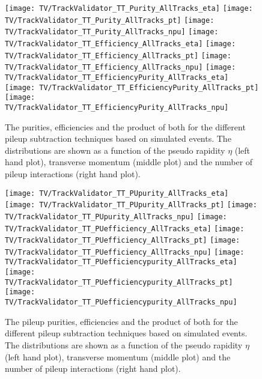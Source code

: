 \begin{figure}[h!t]
  \centering
  \texttt{[image: TV/TrackValidator\_TT\_Purity\_AllTracks\_eta]}
  \texttt{[image: TV/TrackValidator\_TT\_Purity\_AllTracks\_pt]}
  \texttt{[image: TV/TrackValidator\_TT\_Purity\_AllTracks\_npu]}
  \newline
  \texttt{[image: TV/TrackValidator\_TT\_Efficiency\_AllTracks\_eta]}
  \texttt{[image: TV/TrackValidator\_TT\_Efficiency\_AllTracks\_pt]}
  \texttt{[image: TV/TrackValidator\_TT\_Efficiency\_AllTracks\_npu]}
  \newline
  \texttt{[image: TV/TrackValidator\_TT\_EfficiencyPurity\_AllTracks\_eta]}
  \texttt{[image: TV/TrackValidator\_TT\_EfficiencyPurity\_AllTracks\_pt]}
  \texttt{[image: TV/TrackValidator\_TT\_EfficiencyPurity\_AllTracks\_npu]}
  \caption[Purity, efficiency and their product for the different pileup subtraction techniques based on simulated \ttbar events]{The purities, efficiencies and the product of both for the different pileup subtraction techniques based on simulated \ttbar events. The distributions are shown as a function of the pseudo rapidity $\eta$ (left hand plot), transverse momentum (middle plot) and the number of pileup interactions (right hand plot). \label{plot:TACOAACPTTSignal}}
\end{figure}

\begin{figure}[h!t]
  \centering
  \texttt{[image: TV/TrackValidator\_TT\_PUpurity\_AllTracks\_eta]}
  \texttt{[image: TV/TrackValidator\_TT\_PUpurity\_AllTracks\_pt]}
  \texttt{[image: TV/TrackValidator\_TT\_PUpurity\_AllTracks\_npu]}
  \newline
  \texttt{[image: TV/TrackValidator\_TT\_PUefficiency\_AllTracks\_eta]}
  \texttt{[image: TV/TrackValidator\_TT\_PUefficiency\_AllTracks\_pt]}
  \texttt{[image: TV/TrackValidator\_TT\_PUefficiency\_AllTracks\_npu]}
  \newline
  \texttt{[image: TV/TrackValidator\_TT\_PUefficiencypurity\_AllTracks\_eta]}
  \texttt{[image: TV/TrackValidator\_TT\_PUefficiencypurity\_AllTracks\_pt]}
  \texttt{[image: TV/TrackValidator\_TT\_PUefficiencypurity\_AllTracks\_npu]}
  \caption[Pileup purity, efficiency and their product for the different pileup subtraction techniques based on simulated \ttbar events]{The pileup purities, efficiencies and the product of both for the different pileup subtraction techniques based on simulated \ttbar events. The distributions are shown as a function of the pseudo rapidity $\eta$ (left hand plot), transverse momentum (middle plot) and the number of pileup interactions (right hand plot). \label{plot:TACOAACPTTPileup}}
\end{figure}

